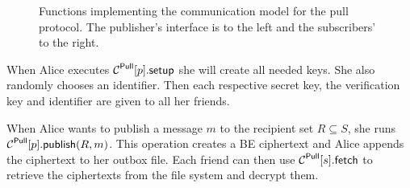 \begin{figure}%
  \caption{%
    Functions implementing the communication model for the pull protocol.
    The publisher's interface is to the left and the subscribers' to the right.
  }\label{PullFunctions}
\end{figure}

When Alice executes \(\psetup{p}\) she will create all needed keys.
She also randomly chooses an identifier.
Then each respective secret key, the verification key and identifier are given 
to all her friends.

When Alice wants to publish a message \(m\) to the recipient set \(R\subseteq 
  S\), she runs \(\ppub{p}[R][m]\).
This operation creates a \ac{BE} ciphertext and Alice appends the ciphertext to 
her outbox file.
Each friend can then use \(\pget{s}\) to retrieve the ciphertexts from the file 
system and decrypt them.

